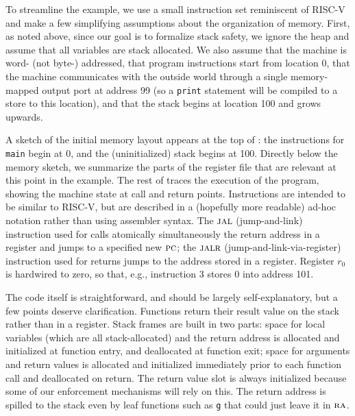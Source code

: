 \documentclass[acmsmall,review,anonymous]{acmart}\settopmatter{printfolios=true,printccs=false,printacmref=false}
\begin{document}
To streamline the example, we use a small instruction set reminiscent of
RISC-V and make a few simplifying assumptions about the organization of
memory.
%
First, as noted above, since our goal is to formalize stack safety, we
ignore the heap
and assume that all variables are stack allocated.
%
We also assume that the machine is word- (not byte-) addressed, that program
instructions start from location 0, that the machine communicates with the
outside world through a single memory-mapped output port at address 99 (so
a {\tt print} statement will be compiled to a store to this
location), and that the stack begins at location 100 and grows upwards.

A sketch of the initial memory layout appears at the top of
: the instructions for {\tt main} begin at 0,
and the (uninitialized)
stack begins at 100. Directly below the memory sketch, we summarize the parts
of the register file that are relevant at this point in the example.
%
The rest of  traces the execution of the
program, showing the machine state at call and return points.
Instructions are intended to
be similar to RISC-V, but are described in a (hopefully more readable)
ad-hoc notation
rather than using assembler syntax. The $\textsc{jal}$ (jump-and-link)
instruction used for calls atomically simultaneously the return address in a
register
and jumps to a specified new $\textsc{pc}$; the $\textsc{jalr}$ (jump-and-link-via-register)
instruction used for returns jumps to the address stored in a register.
Register $r_0$ is hardwired to zero, so that, e.g., instruction 3 stores $0$
into address 101.

The code itself is straightforward, and should be largely self-explanatory, but
a few points deserve clarification. Functions return their result value on the
stack rather than in a register.  Stack frames are built in two parts:
space for local variables (which are all stack-allocated) and the return address is allocated and initialized at function entry, and deallocated at function exit; space for arguments and return values is allocated and initialized immediately prior to each function call and deallocated on return. The return value slot is always initialized
because some of our enforcement mechanisms will rely on this.
\ifaftersubmission{}\fi
The return address is spilled to the stack even by leaf functions such as
{\tt g} that could just leave it in $\textsc{ra}$.
\end{document}
